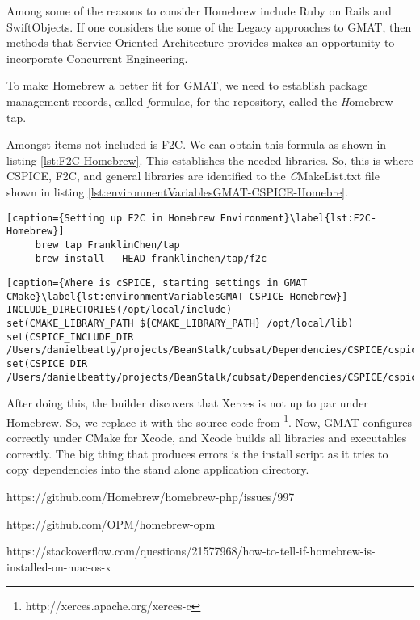 \documentclass[
  a4paper, %
  11pt, %
  twoside,    %
  onecolumn,  %
  openright,  %
]{memoir}
\begin{document}

Among some of the reasons to consider Homebrew include Ruby on Rails and SwiftObjects.  If one considers the some of the Legacy approaches to GMAT, then methods that Service Oriented Architecture provides makes an opportunity to incorporate Concurrent Engineering.

To make Homebrew a better fit for GMAT, we need to establish package management records, called {\textit formulae}, for the repository, called the {\textit Homebrew tap}.

Amongst items not included is F2C. We can obtain this formula as shown in listing \ref{lst:F2C-Homebrew}.  This establishes the needed libraries.  So, this is where CSPICE, F2C, and general libraries are identified to the {\textit CMakeList.txt} file shown in listing \ref{lst:environmentVariablesGMAT-CSPICE-Homebre}.
\begin{lstlisting}[caption={Setting up F2C in Homebrew Environment}\label{lst:F2C-Homebrew}]
	 brew tap FranklinChen/tap
	 brew install --HEAD franklinchen/tap/f2c
\end{lstlisting}


\begin{tiny}
	\begin{lstlisting}[caption={Where is cSPICE, starting settings in GMAT CMake}\label{lst:environmentVariablesGMAT-CSPICE-Homebrew}]
INCLUDE_DIRECTORIES(/opt/local/include)
set(CMAKE_LIBRARY_PATH ${CMAKE_LIBRARY_PATH} /opt/local/lib)
set(CSPICE_INCLUDE_DIR /Users/danielbeatty/projects/BeanStalk/cubsat/Dependencies/CSPICE/cspice/include)
set(CSPICE_DIR /Users/danielbeatty/projects/BeanStalk/cubsat/Dependencies/CSPICE/cspice)
	\end{lstlisting}
\end{tiny}
After doing this, the builder discovers that Xerces is not up to par under Homebrew.  So, we replace it with the source code from \footnote{http://xerces.apache.org/xerces-c}.  Now, GMAT configures correctly under CMake for Xcode, and Xcode builds all libraries and executables correctly.  The big thing that produces errors is the install script as it tries to copy dependencies into the stand alone application directory.  

https://github.com/Homebrew/homebrew-php/issues/997

https://github.com/OPM/homebrew-opm

https://stackoverflow.com/questions/21577968/how-to-tell-if-homebrew-is-installed-on-mac-os-x
\end{document}
